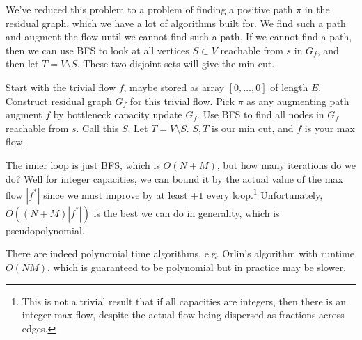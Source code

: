 \documentclass{article}
\begin{document}
    \begin{algo}
      We've reduced this problem to a problem of finding a positive path $\pi$ in the residual graph, which we have a lot of algorithms built for. We find such a path and augment the flow until we cannot find such a path. If we cannot find a path, then we can use BFS to look at all vertices $S \subset V$ reachable from $s$ in $G_f$, and then let $T = V \setminus S$. These two disjoint sets will give the min cut. 
      
      \begin{algorithm}[H]
        \label{alg:maxflow}
        \begin{algorithmic}
          \State 
          \State Start with the trivial flow $f$, maybe stored as array $[0, \ldots, 0]$ of length $E$. 
            \State Construct residual graph $G_f$ for this trivial flow. 
             
              \State Pick $\pi$ as any augmenting path 
              \State augment $f$ by bottleneck capacity 
              \State update $G_f$. 
            \EndWhile
            \State {}  
            \State Use BFS to find all nodes in $G_f$ reachable from $s$. Call this $S$.  
            \State Let $T = V \setminus S$.  
            \State $S, T$ is our min cut, and $f$ is your max flow. 
          \EndFunction
        \end{algorithmic}
      \end{algorithm}
      The inner loop is just BFS, which is $O(N + M)$, but how many iterations do we do? Well for integer capacities, we can bound it by the actual value of the max flow $|f^\ast|$ since we must improve by at least $+1$ every loop.\footnote{This is not a trivial result that if all capacities are integers, then there is an integer max-flow, despite the actual flow being dispersed as fractions across edges.} Unfortunately, $O((N+M) |f^\ast|)$ is the best we can do in generality, which is pseudopolynomial. 
    \end{algo}

    There are indeed polynomial time algorithms, e.g. Orlin's algorithm with runtime $O(NM)$, which is guaranteed to be polynomial but in practice may be slower. 
\end{document}
